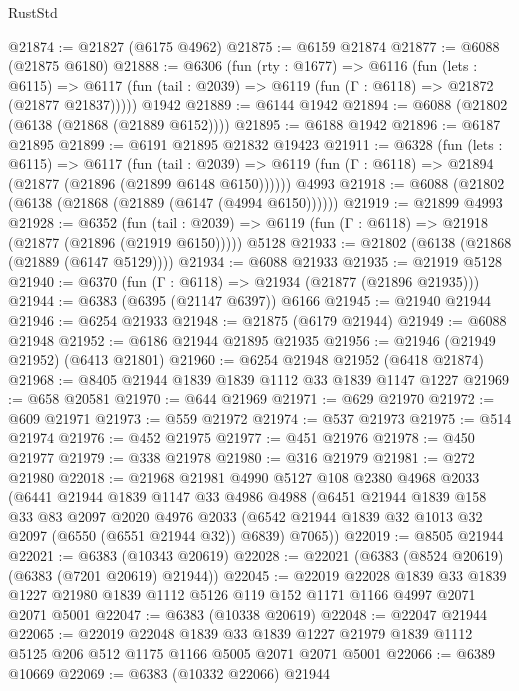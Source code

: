\begin{lexlean}{RustStd}
\begin{coremodule}
@21874 := @21827 (@6175 @4962)
@21875 := @6159 @21874
@21877 := @6088 (@21875 @6180)
@21888 := @6306
    (fun (rty : @1677) =>
    @6116
      (fun (lets : @6115) =>
      @6117 (fun (tail : @2039) => @6119 (fun (Γ : @6118) => @21872 (@21877 @21837)))))
    @1942
@21889 := @6144 @1942
@21894 := @6088 (@21802 (@6138 (@21868 (@21889 @6152))))
@21895 := @6188 @1942
@21896 := @6187 @21895
@21899 := @6191 @21895 @21832 @19423
@21911 := @6328
    (fun (lets : @6115) =>
    @6117
      (fun (tail : @2039) =>
      @6119 (fun (Γ : @6118) => @21894 (@21877 (@21896 (@21899 @6148 @6150))))))
    @4993
@21918 := @6088 (@21802 (@6138 (@21868 (@21889 (@6147 (@4994 @6150))))))
@21919 := @21899 @4993
@21928 := @6352
    (fun (tail : @2039) => @6119 (fun (Γ : @6118) => @21918 (@21877 (@21896 (@21919 @6150)))))
    @5128
@21933 := @21802 (@6138 (@21868 (@21889 (@6147 @5129))))
@21934 := @6088 @21933
@21935 := @21919 @5128
@21940 := @6370 (fun (Γ : @6118) => @21934 (@21877 (@21896 @21935)))
@21944 := @6383 (@6395 (@21147 @6397)) @6166
@21945 := @21940 @21944
@21946 := @6254 @21933
@21948 := @21875 (@6179 @21944)
@21949 := @6088 @21948
@21952 := @6186 @21944 @21895 @21935
@21956 := @21946 (@21949 @21952) (@6413 @21801)
@21960 := @6254 @21948 @21952 (@6418 @21874)
@21968 := @8405 @21944 @1839 @1839 @1112 @33 @1839 @1147 @1227
@21969 := @658 @20581
@21970 := @644 @21969
@21971 := @629 @21970
@21972 := @609 @21971
@21973 := @559 @21972
@21974 := @537 @21973
@21975 := @514 @21974
@21976 := @452 @21975
@21977 := @451 @21976
@21978 := @450 @21977
@21979 := @338 @21978
@21980 := @316 @21979
@21981 := @272 @21980
@22018 := @21968
    @21981
    @4990
    @5127
    @108
    @2380
    @4968
    @2033
    (@6441
      @21944
      @1839
      @1147
      @33
      @4986
      @4988
      (@6451
        @21944
        @1839
        @158
        @33
        @83
        @2097
        @2020
        @4976
        @2033
        (@6542 @21944 @1839 @32 @1013 @32 @2097 (@6550 (@6551 @21944 @32)) @6839)
        @7065))
@22019 := @8505 @21944
@22021 := @6383 (@10343 @20619)
@22028 := @22021 (@6383 (@8524 @20619) (@6383 (@7201 @20619) @21944))
@22045 := @22019
    @22028
    @1839
    @33
    @1839
    @1227
    @21980
    @1839
    @1112
    @5126
    @119
    @152
    @1171
    @1166
    @4997
    @2071
    @2071
    @5001
@22047 := @6383 (@10338 @20619)
@22048 := @22047 @21944
@22065 := @22019
    @22048
    @1839
    @33
    @1839
    @1227
    @21979
    @1839
    @1112
    @5125
    @206
    @512
    @1175
    @1166
    @5005
    @2071
    @2071
    @5001
@22066 := @6389 @10669
@22069 := @6383 (@10332 @22066) @21944

\end{coremodule}
\end{lexlean}
